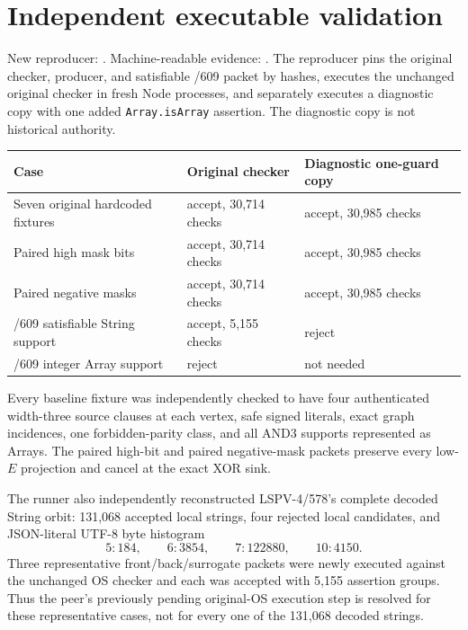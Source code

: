 \documentclass[11pt]{article}
\begin{document}
\section*{Independent executable validation}
\noindent
New reproducer:
.
Machine-readable evidence:
.
The reproducer pins the original checker, producer, and satisfiable /609 packet
by hashes, executes the unchanged original checker in fresh Node processes,
and separately executes a diagnostic copy with one added
\texttt{Array.isArray} assertion.  The diagnostic copy is not historical
authority.

\begin{center}
\begin{tabular}{lll}
\toprule
Case & Original checker & Diagnostic one-guard copy\\
\midrule
Seven original hardcoded fixtures & accept, 30,714 checks & accept, 30,985 checks\\
Paired high mask bits & accept, 30,714 checks & accept, 30,985 checks\\
Paired negative masks & accept, 30,714 checks & accept, 30,985 checks\\
/609 satisfiable String support & accept, 5,155 checks & reject\\
/609 integer Array support & reject & not needed\\
\bottomrule
\end{tabular}
\end{center}

Every baseline fixture was independently checked to have four authenticated
width-three source clauses at each vertex, safe signed literals, exact graph
incidences, one forbidden-parity class, and all AND3 supports represented as
Arrays.  The paired high-bit and paired negative-mask packets preserve every
low-$E$ projection and cancel at the exact XOR sink.

The runner also independently reconstructed LSPV-4/578's complete decoded
String orbit: 131,068 accepted local strings, four rejected local candidates,
and JSON-literal UTF-8 byte histogram
\[
  5:184,\qquad 6:3854,\qquad 7:122880,\qquad 10:4150.
\]
Three representative front/back/surrogate packets were newly executed against
the unchanged OS checker and each was accepted with 5,155 assertion groups.
Thus the peer's previously pending original-OS execution step is resolved for
these representative cases, not for every one of the 131,068 decoded strings.
\end{document}
